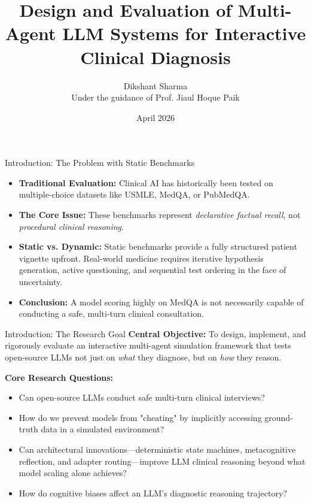 \documentclass[10pt, aspectratio=169]{beamer}
\title[AgentClinic v2]{Design and Evaluation of Multi-Agent LLM Systems for Interactive Clinical Diagnosis}
\author[Dikshant Sharma]{Dikshant Sharma \\ \vspace{0.2cm} \small{Under the guidance of Prof. Jiaul Hoque Paik}}
\institute[IIT KGP]{Department of Artificial Intelligence \\ Indian Institute of Technology Kharagpur}
\date{April 2026}
\begin{document}
\begin{frame}
    \titlepage
\end{frame}

\begin{frame}{Introduction: The Problem with Static Benchmarks}
    \begin{itemize}
        \item \textbf{Traditional Evaluation:} Clinical AI has historically been tested on multiple-choice datasets like USMLE, MedQA, or PubMedQA.
        \item \textbf{The Core Issue:} These benchmarks represent \textit{declarative factual recall}, not \textit{procedural clinical reasoning}.
        \item \textbf{Static vs. Dynamic:} Static benchmarks provide a fully structured patient vignette upfront. Real-world medicine requires iterative hypothesis generation, active questioning, and sequential test ordering in the face of uncertainty.
        \item \textbf{Conclusion:} A model scoring highly on MedQA is not necessarily capable of conducting a safe, multi-turn clinical consultation.
    \end{itemize}
\end{frame}

\begin{frame}{Introduction: The Research Goal}
    \textbf{Central Objective:}
    To design, implement, and rigorously evaluate an interactive multi-agent simulation framework that tests open-source LLMs not just on \textit{what} they diagnose, but on \textit{how} they reason.

    \vspace{0.3cm}
    \textbf{Core Research Questions:}
    \begin{itemize}
        \item Can open-source LLMs conduct safe multi-turn clinical interviews?
        \item How do we prevent models from "cheating" by implicitly accessing ground-truth data in a simulated environment?
        \item Can architectural innovations---deterministic state machines, metacognitive reflection, and adapter routing---improve LLM clinical reasoning beyond what model scaling alone achieves?
        \item How do cognitive biases affect an LLM's diagnostic reasoning trajectory?
    \end{itemize}
\end{frame}
\end{document}
